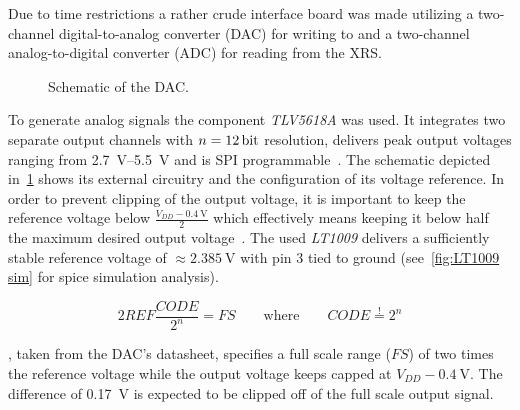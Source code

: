             Due to time restrictions a rather crude interface board was made utilizing a two-channel digital-to-analog converter (DAC) for writing to and a two-channel analog-to-digital converter (ADC) for reading from the XRS.\@
            \begin{figure}[h]
                \centering
                
                \caption[Schematic of the DAC]{Schematic of the DAC.}%
                \label{fig:DAC schematic}
            \end{figure}
            To generate analog signals the component \textit{TLV5618A} was used.
            It integrates two separate output channels with \(n = \qty{12}{\bit}\) resolution, delivers peak output voltages ranging from \qtyrange{2.7}{5.5}{\volt} and is SPI programmable~\cite{Manual.DAC.TLV5618A}.
            The schematic depicted in~\cref{fig:DAC schematic} shows its external circuitry and the configuration of its voltage reference.
            In order to prevent clipping of the output voltage, it is important to keep the reference voltage below \(\frac{V_{DD} - \qty{0.4}{\volt}}{2}\) which effectively means keeping it below half the maximum desired output voltage~\cite[p. 3]{Manual.DAC.TLV5618A}.
            The used \textit{LT1009} delivers a sufficiently stable reference voltage of \(\approx \qty{2.385}{\volt}\) with pin 3 tied to ground (see~\cref{fig:LT1009 sim} for spice simulation analysis).

            \begin{equation}
                2REF\frac{CODE}{2^n} = FS \qquad \text{where} \qquad CODE \overset{!}{=} 2^n
                \label{eq:dac general function}
            \end{equation}

            , taken from the DAC's datasheet, specifies a full scale range (\(FS\)) of two times the reference voltage while the output voltage keeps capped at \(V_{DD}- \qty{0.4}{\volt}\).
            The difference of \qty{0.17}{\volt} is expected to be clipped off of the full scale output signal.\par\medskip

